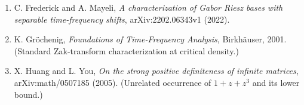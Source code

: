 \documentclass[11pt]{article}
\begin{document}
\begin{enumerate}
\item C. Frederick and A. Mayeli, \emph{A characterization of Gabor Riesz
  bases with separable time-frequency shifts}, arXiv:2202.06343v1 (2022).
\item K. Gr\"ochenig, \emph{Foundations of Time-Frequency Analysis},
  Birkh\"auser, 2001. (Standard Zak-transform characterization at critical
  density.)
\item X. Huang and L. You, \emph{On the strong positive definiteness of
  infinite matrices},\\ arXiv:math/0507185 (2005). (Unrelated occurrence of
  $1+z+z^3$ and its lower bound.)
\end{enumerate}
\end{document}
